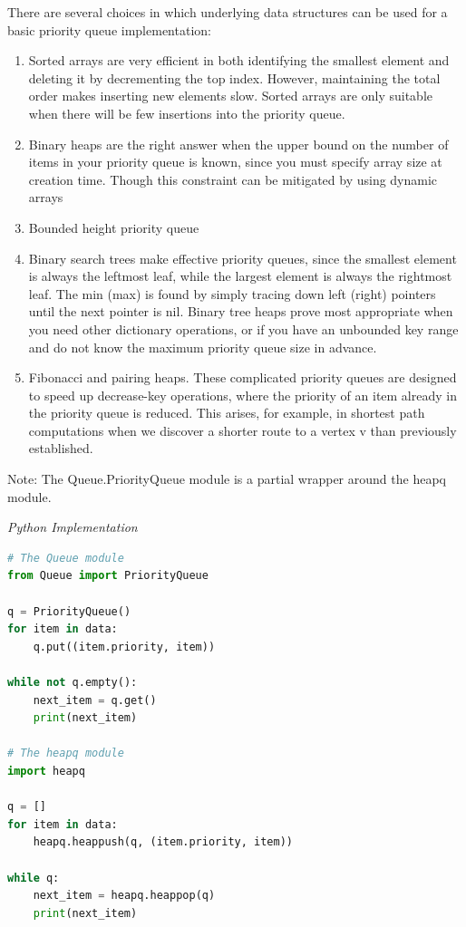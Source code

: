 \documentclass{article}
\begin{document}
    There are several choices in which underlying data structures can be used for a basic priority queue implementation:
    \begin{enumerate}
        \item Sorted arrays are very efficient in both identifying the smallest element and deleting it by decrementing the top index. However, maintaining the total order makes inserting new elements slow. Sorted arrays are only suitable when there will be few insertions into the priority queue.
        
        \item Binary heaps are the right answer when the upper bound on the number of items in your priority queue is known, since you must specify array size at creation time. Though this constraint can be mitigated by using dynamic arrays
        
        \item Bounded height priority queue
        
        \item Binary search trees make effective priority queues, since the smallest element is always the leftmost leaf, while the largest element is always the rightmost leaf. The min (max) is found by simply tracing down left (right) pointers until the next pointer is nil. Binary tree heaps prove most appropriate when you need other dictionary operations, or if you have an unbounded key range and do not know the maximum priority queue size in advance.
        
        \item Fibonacci and pairing heaps. These complicated priority queues are designed to speed up decrease-key operations, where the priority of an item already in the priority queue is reduced. This arises, for example, in shortest path computations when we discover a shorter route to a vertex v than previously established.
    \end{enumerate}
    
    Note: The Queue.PriorityQueue module is a partial wrapper around the heapq module.
    
\vspace{8pt} \emph{Python Implementation}
\begin{lstlisting}[language=Python]
# The Queue module
from Queue import PriorityQueue

q = PriorityQueue()
for item in data:
    q.put((item.priority, item))

while not q.empty():
    next_item = q.get()
    print(next_item)

# The heapq module
import heapq

q = []
for item in data:
    heapq.heappush(q, (item.priority, item))

while q:
    next_item = heapq.heappop(q)
    print(next_item)
\end{lstlisting}
    
\end{document}
